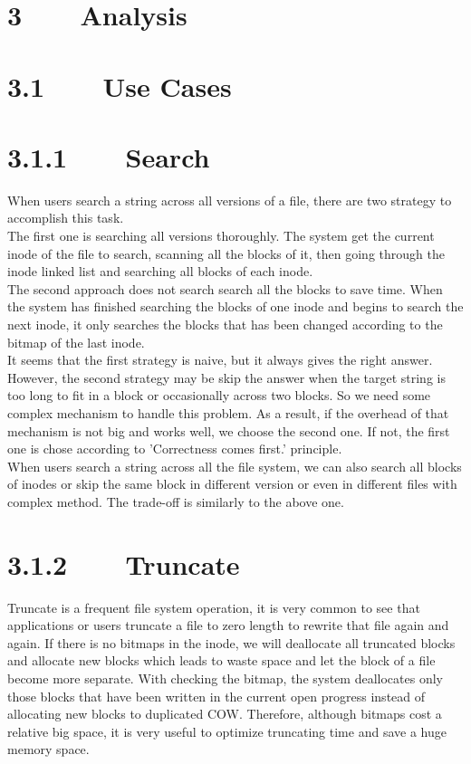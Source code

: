 \section*{3~~~~Analysis}
\section*{3.1~~~~Use Cases}
\section*{3.1.1~~~~Search}
When users search a string across all versions of a file, there are two strategy to accomplish this task.\\[1em]
The first one is searching all versions thoroughly. The system get the current inode of the file to search, scanning all the blocks of it,  then going through the inode linked list and searching all blocks of each inode.\\[1em]
The second approach does not search search all the blocks to save time. When the system has finished searching the blocks of one inode and begins to search the next inode, it only searches the blocks that has been changed according to the bitmap of the last inode.\\[1em]
It seems that the first strategy is naive, but it always gives the right answer. However, the second strategy may be skip the answer when the target string is too long to fit in a block or occasionally across  two blocks. So we need some complex mechanism to handle this problem. As a result, if the overhead of that mechanism is not big and works well, we choose the second one. If not, the first one is chose according to 'Correctness comes first.' principle.\\[1em]
When users search a string across all the file system, we can also search all blocks of inodes or skip the same block in different version or even in different files with complex method. The trade-off is similarly to  the above one.
\section*{3.1.2~~~~Truncate}
Truncate is a frequent file system operation, it is very common to see that applications or users truncate a file to zero length to rewrite that file again and again. If there is no bitmaps in the inode, we will deallocate all truncated blocks and allocate new blocks which leads to waste space and let the block of a file become more separate. With checking the bitmap, the system deallocates only those blocks that have been written in the current open progress instead of allocating new blocks to duplicated COW. Therefore, although bitmaps cost a relative big space, it is very useful to optimize truncating time and save a huge memory space.
